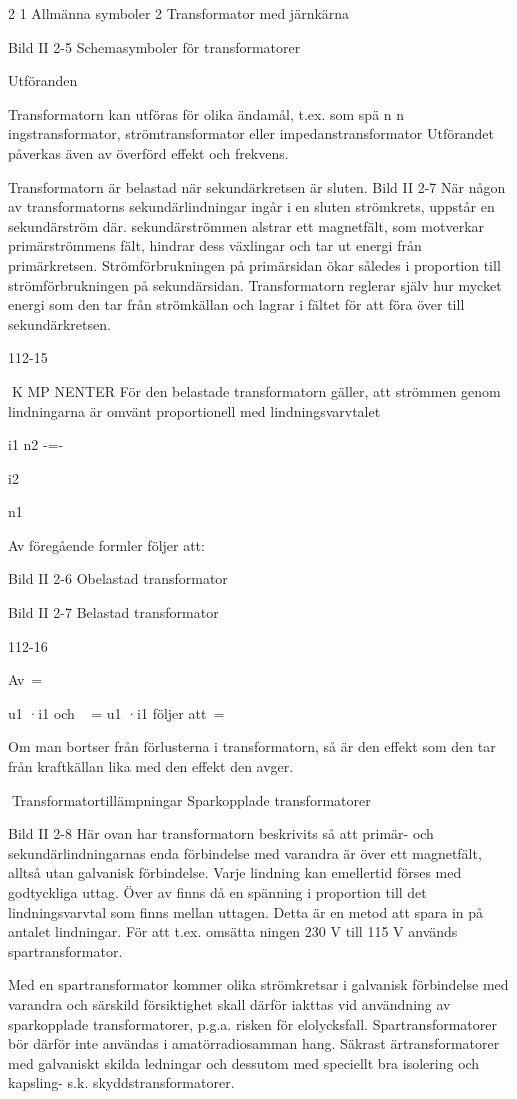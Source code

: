 {2
1 Allmänna symboler
2 Transformator med järnkärna

Bild II 2-5 Schemasymboler för
transformatorer

Utföranden

Transformatorn kan utföras för olika ändamål, t.ex. som
spä n n ingstransformator,
strömtransformator eller
impedanstransformator
Utförandet påverkas även av överförd effekt
och frekvens.

Transformatorn är belastad när sekundärkretsen är sluten.
Bild II 2-7
När någon av transformatorns sekundärlindningar ingår i en sluten strömkrets, uppstår en sekundärström där.
sekundärströmmen alstrar ett magnetfält, som motverkar primärströmmens fält,
hindrar dess växlingar och tar ut energi från
primärkretsen.
Strömförbrukningen på primärsidan ökar
således i proportion till strömförbrukningen
på sekundärsidan. Transformatorn reglerar
själv hur mycket energi som den tar från
strömkällan och lagrar i fältet för att föra över
till sekundärkretsen.

112-15

K MP NENTER
För den belastade transformatorn gäller, att
strömmen genom lindningarna är omvänt
proportionell med lindningsvarvtalet

i1 n2
-=-

i2

n1

Av föregående formler följer att:

Bild II 2-6 Obelastad transformator

Bild II 2-7 Belastad transformator

112-16

Av~=

u1 ·i1 och ~ = u1 ·i1 följer att~=~

Om man bortser från förlusterna i transformatorn, så är den effekt som den tar från
kraftkällan lika med den effekt den avger.

Transformatortillämpningar
Sparkopplade transformatorer

Bild II 2-8
Här ovan har transformatorn beskrivits så att
primär- och sekundärlindningarnas enda
förbindelse med varandra är över ett magnetfält, alltså utan galvanisk förbindelse.
Varje lindning kan emellertid förses med
godtyckliga uttag. Över
av
finns då en spänning i proportion till det
lindningsvarvtal som finns mellan uttagen.
Detta är en metod att spara in på antalet
lindningar. För att t.ex. omsätta
ningen 230 V till 115 V används
spartransformator.

Med en spartransformator kommer olika
strömkretsar i galvanisk förbindelse med
varandra och särskild försiktighet skall därför iakttas vid användning av sparkopplade
transformatorer, p.g.a. risken för elolycksfall. Spartransformatorer bör därför inte användas i amatörradiosamman hang. Säkrast
ärtransformatorer med galvaniskt skilda ledningar och dessutom med speciellt bra isolering och kapsling- s.k. skyddstransformatorer.

}
